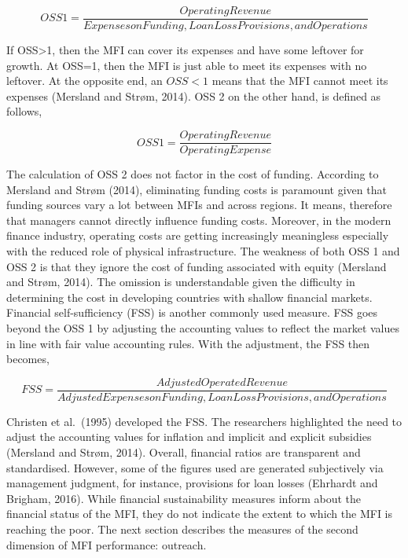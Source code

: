 \documentclass[a4paper, nobind]{templates/ociamthesis}
\begin{document}
\begin{equation}
OSS1 = \frac{Operating Revenue}{Expenses on Funding, Loan Loss Provisions, and Operations}
\end{equation}

If OSS\textgreater1, then the MFI can cover its expenses and have some leftover for growth. At OSS=1, then the MFI is just able to meet its expenses with no leftover. At the opposite end, an \(OSS < 1\) means that the MFI cannot meet its expenses (Mersland and Strøm, 2014).
OSS 2 on the other hand, is defined as follows,

\begin{equation}
OSS1 = \frac{Operating Revenue}{Operating Expense}
\end{equation}

The calculation of OSS 2 does not factor in the cost of funding. According to Mersland and Strøm (2014), eliminating funding costs is paramount given that funding sources vary a lot between MFIs and across regions. It means, therefore that managers cannot directly influence funding costs. Moreover, in the modern finance industry, operating costs are getting increasingly meaningless especially with the reduced role of physical infrastructure. The weakness of both OSS 1 and OSS 2 is that they ignore the cost of funding associated with equity (Mersland and Strøm, 2014). The omission is understandable given the difficulty in determining the cost in developing countries with shallow financial markets. Financial self-sufficiency (FSS) is another commonly used measure. FSS goes beyond the OSS 1 by adjusting the accounting values to reflect the market values in line with fair value accounting rules. With the adjustment, the FSS then becomes,

\begin{equation}
FSS = \frac{Adjusted Operated Revenue}{Adjusted Expenses on Funding, Loan Loss Provisions, and Operations}
\end{equation}

Christen et al.~(1995) developed the FSS. The researchers highlighted the need to adjust the accounting values for inflation and implicit and explicit subsidies (Mersland and Strøm, 2014). Overall, financial ratios are transparent and standardised. However, some of the figures used are generated subjectively via management judgment, for instance, provisions for loan losses (Ehrhardt and Brigham, 2016). While financial sustainability measures inform about the financial status of the MFI, they do not indicate the extent to which the MFI is reaching the poor. The next section describes the measures of the second dimension of MFI performance: outreach.
\end{document}
